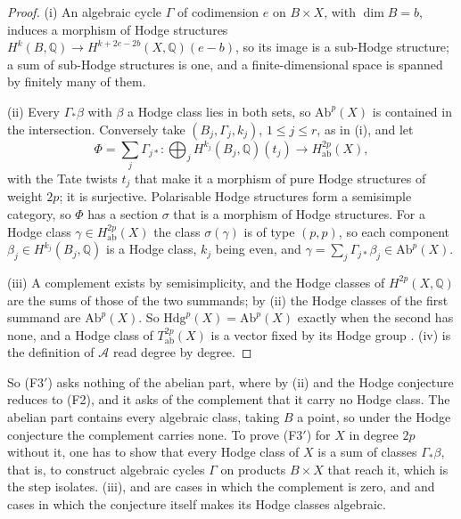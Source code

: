 \documentclass[11pt,reqno]{amsart}
\theoremstyle{plain}
\theoremstyle{definition}
\theoremstyle{remark}
\newcommand{\QQ}{\mathbb{Q}}
\newcommand{\Hdg}{\mathrm{Hdg}}
\begin{document}
\begin{proof}
(i) An algebraic cycle $\Gamma$ of codimension $e$ on $B\times X$, with
$\dim B=b$, induces a morphism of Hodge structures
$H^{k}(B,\QQ)\to H^{k+2e-2b}(X,\QQ)(e-b)$, so its image is a sub-Hodge
structure; a sum of sub-Hodge structures is one, and a finite-dimensional
space is spanned by finitely many of them.

(ii) Every $\Gamma_{*}\beta$ with $\beta$ a Hodge class lies in both sets, so
$\mathrm{Ab}^{p}(X)$ is contained in the intersection. Conversely take
$(B_{j},\Gamma_{j},k_{j})$, $1\le j\le r$, as in (i), and let
\[
  \Phi=\sum_{j}\Gamma_{j*}\colon
  \bigoplus_{j}H^{k_{j}}(B_{j},\QQ)(t_{j})\longrightarrow
  H^{2p}_{\mathrm{ab}}(X),
\]
with the Tate twists $t_{j}$ that make it a morphism of pure Hodge structures
of weight $2p$; it is surjective. Polarisable Hodge structures form a
semisimple category, so $\Phi$ has a section $\sigma$ that is a morphism of
Hodge structures. For a Hodge class $\gamma\in H^{2p}_{\mathrm{ab}}(X)$ the
class $\sigma(\gamma)$ is of type $(p,p)$, so each component
$\beta_{j}\in H^{k_{j}}(B_{j},\QQ)$ is a Hodge class, $k_{j}$ being even, and
$\gamma=\sum_{j}\Gamma_{j*}\beta_{j}\in\mathrm{Ab}^{p}(X)$.

(iii) A complement exists by semisimplicity, and the Hodge classes of
$H^{2p}(X,\QQ)$ are the sums of those of the two summands; by (ii) the
Hodge classes of the first summand are $\mathrm{Ab}^{p}(X)$. So
$\Hdg^{p}(X)=\mathrm{Ab}^{p}(X)$ exactly when the second has none, and a
Hodge class of $T^{2p}_{\mathrm{ab}}(X)$ is a vector fixed by its Hodge group
\cite[\S3]{Del82}. (iv) is the definition of $\mathcal{A}$ read degree by
degree.
\end{proof}

So \textup{(F3$'$)} asks nothing of the abelian part, where by (ii) and
 the Hodge conjecture reduces to (F2), and it asks of the
complement that it carry no Hodge class. The abelian part contains every
algebraic class, taking $B$ a point, so under the Hodge conjecture the
complement carries none. To prove \textup{(F3$'$)} for $X$ in degree $2p$
without it, one has to show that every Hodge class of $X$ is a sum of
classes $\Gamma_{*}\beta$, that is, to construct algebraic cycles $\Gamma$
on products $B\times X$ that reach it, which is the step
 isolates.
(iii),  and 
are cases in which the complement is zero, and  and
 cases in which the conjecture itself makes its Hodge
classes algebraic.
\end{document}
